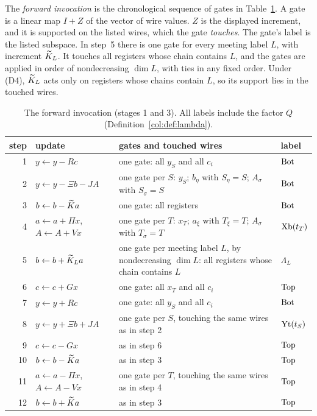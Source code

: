 \begin{definition}\label{col:def:forward}
The \emph{forward invocation} is the chronological sequence of gates in
Table~\ref{col:tab:schedule}. A gate is a linear map $I+Z$ of the vector of wire values. $Z$ is the
displayed increment, and it is supported on the listed wires, which the gate \emph{touches}. The gate's
label is the listed subspace. In step~5 there is one gate for every meeting label $L$, with increment
$\widetilde K_L$. It touches all registers whose chain contains $L$, and the gates are applied in order of
nondecreasing $\dim L$, with ties in any fixed order. Under (D4), $\widetilde K_L$ acts only on registers whose
chains contain $L$, so its support lies in the touched wires.
\end{definition}

\begin{table}[ht]\centering\small
\begin{tabular}{@{}r l p{6.9cm} l@{}}
\toprule
step & update & gates and touched wires & label\\
\midrule
1 & $y\leftarrow y-Rc$ & one gate: all $y_S$ and all $c_i$ & $\mathrm{Bot}$\\
2 & $y\leftarrow y-\Xi b-JA$ & one gate per $S$: $y_S$; $b_\eta$ with $S_\eta=S$; $A_\sigma$ with $S_\sigma=S$ & $\mathrm{Bot}$\\
3 & $b\leftarrow b-\widetilde K a$ & one gate: all registers & $\mathrm{Bot}$\\
4 & $a\leftarrow a+\Pi x$, $A\leftarrow A+Vx$ & one gate per $T$: $x_T$; $a_\xi$ with $T_\xi=T$; $A_\sigma$ with $T_\sigma=T$ & $\mathrm{Xb}(t_T)$\\
5 & $b\leftarrow b+\widetilde K_L a$ & one gate per meeting label $L$, by nondecreasing $\dim L$: all registers whose chain contains $L$ & $\Lambda_L$\\
6 & $c\leftarrow c+Gx$ & one gate: all $x_T$ and all $c_i$ & $\mathrm{Top}$\\
7 & $y\leftarrow y+Rc$ & one gate: all $y_S$ and all $c_i$ & $\mathrm{Bot}$\\
8 & $y\leftarrow y+\Xi b+JA$ & one gate per $S$, touching the same wires as in step 2 & $\mathrm{Yt}(t_S)$\\
9 & $c\leftarrow c-Gx$ & as in step 6 & $\mathrm{Top}$\\
10 & $b\leftarrow b-\widetilde K a$ & as in step 3 & $\mathrm{Top}$\\
11 & $a\leftarrow a-\Pi x$, $A\leftarrow A-Vx$ & one gate per $T$, touching the same wires as in step 4 & $\mathrm{Top}$\\
12 & $b\leftarrow b+\widetilde K a$ & as in step 3 & $\mathrm{Top}$\\
\bottomrule
\end{tabular}
\caption{The forward invocation (stages 1 and 3). All labels include the factor $Q$
(Definition~\ref{col:def:lambda}).}\label{col:tab:schedule}
\end{table}

